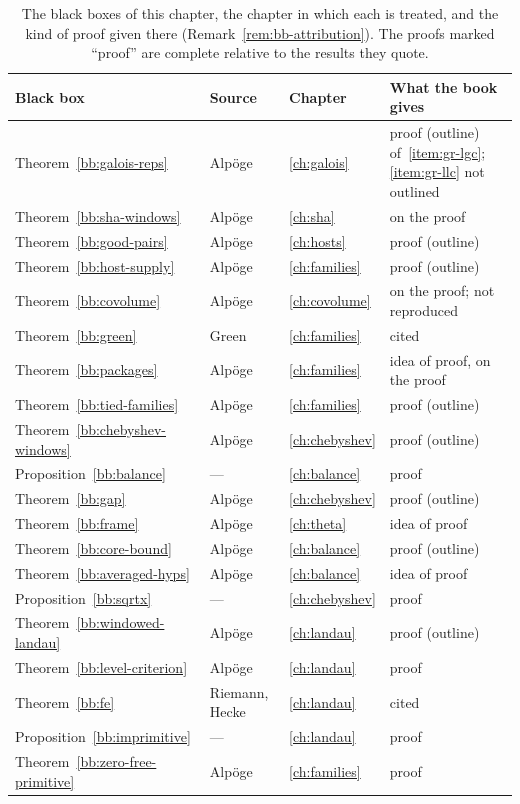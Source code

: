 \documentclass[11pt]{amsbook}
\theoremstyle{plain}
\theoremstyle{definition}
\theoremstyle{remark}
\numberwithin{equation}{section}
\numberwithin{figure}{chapter}
\numberwithin{table}{chapter}
\begin{document}
\begin{table}[htbp]
\centering\small
\renewcommand{\arraystretch}{1.15}
\begin{tabular}{@{}lll
  >{\raggedright\arraybackslash}p{4.2cm}@{}}
\toprule
Black box & Source & Chapter & What the book gives\\
\midrule
Theorem~\ref{bb:galois-reps} & Alp\"oge & \ref{ch:galois} &
proof (outline) of~\ref{item:gr-lgc}; \ref{item:gr-llc} not outlined\\
Theorem~\ref{bb:sha-windows} & Alp\"oge & \ref{ch:sha} &
on the proof\\
Theorem~\ref{bb:good-pairs} & Alp\"oge & \ref{ch:hosts} &
proof (outline)\\
Theorem~\ref{bb:host-supply} & Alp\"oge & \ref{ch:families} &
proof (outline)\\
Theorem~\ref{bb:covolume} & Alp\"oge & \ref{ch:covolume} &
on the proof; not reproduced\\
Theorem~\ref{bb:green} & Green & \ref{ch:families} & cited\\
Theorem~\ref{bb:packages} & Alp\"oge & \ref{ch:families} &
idea of proof, on the proof\\
Theorem~\ref{bb:tied-families} & Alp\"oge & \ref{ch:families} &
proof (outline)\\
Theorem~\ref{bb:chebyshev-windows} & Alp\"oge & \ref{ch:chebyshev} &
proof (outline)\\
Proposition~\ref{bb:balance} & --- & \ref{ch:balance} & proof\\
Theorem~\ref{bb:gap} & Alp\"oge & \ref{ch:chebyshev} &
proof (outline)\\
Theorem~\ref{bb:frame} & Alp\"oge & \ref{ch:theta} & idea of proof\\
Theorem~\ref{bb:core-bound} & Alp\"oge & \ref{ch:balance} &
proof (outline)\\
Theorem~\ref{bb:averaged-hyps} & Alp\"oge & \ref{ch:balance} &
idea of proof\\
Proposition~\ref{bb:sqrtx} & --- & \ref{ch:chebyshev} & proof\\
Theorem~\ref{bb:windowed-landau} & Alp\"oge & \ref{ch:landau} &
proof (outline)\\
Theorem~\ref{bb:level-criterion} & Alp\"oge & \ref{ch:landau} &
proof\\
Theorem~\ref{bb:fe} & Riemann, Hecke & \ref{ch:landau} & cited\\
Proposition~\ref{bb:imprimitive} & --- & \ref{ch:landau} & proof\\
Theorem~\ref{bb:zero-free-primitive} & Alp\"oge &
\ref{ch:families} & proof\\
\bottomrule
\end{tabular}
\caption{The black boxes of this chapter, the chapter in which each
is treated, and the kind of proof given there
(Remark~\ref{rem:bb-attribution}). The proofs marked ``proof'' are
complete relative to the results they quote.}
\label{tab:bb-status}
\end{table}
\end{document}
